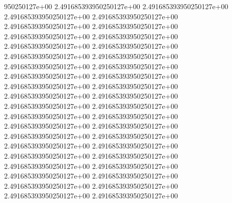 950250127e+00	2.491685393950250127e+00	2.491685393950250127e+00	2.491685393950250127e+00	2.491685393950250127e+00	2.491685393950250127e+00	2.491685393950250127e+00	2.491685393950250127e+00	2.491685393950250127e+00	2.491685393950250127e+00	2.491685393950250127e+00	2.491685393950250127e+00	2.491685393950250127e+00	2.491685393950250127e+00	2.491685393950250127e+00	2.491685393950250127e+00	2.491685393950250127e+00	2.491685393950250127e+00	2.491685393950250127e+00	2.491685393950250127e+00	2.491685393950250127e+00	2.491685393950250127e+00	2.491685393950250127e+00	2.491685393950250127e+00	2.491685393950250127e+00	2.491685393950250127e+00	2.491685393950250127e+00	2.491685393950250127e+00	2.491685393950250127e+00	2.491685393950250127e+00	2.491685393950250127e+00	2.491685393950250127e+00	2.491685393950250127e+00	2.491685393950250127e+00	2.491685393950250127e+00	2.491685393950250127e+00	2.491685393950250127e+00	2.491685393950250127e+00	2.491685393950250127e+00	2.491685393950250127e+00	2.491685393950250127e+00
